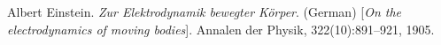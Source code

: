 \renewcommand{\bibname}{References}

\begin{thebibliography}{9}

    Albert Einstein. 
    \textit{Zur Elektrodynamik bewegter K{\"o}rper}. (German) 
    [\textit{On the electrodynamics of moving bodies}]. 
    Annalen der Physik, 322(10):891--921, 1905.

\end{thebibliography}